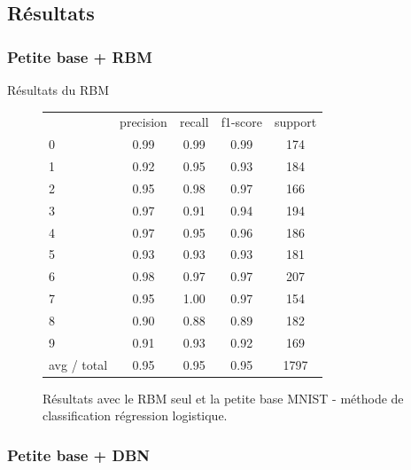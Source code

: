 \subsection{Résultats}

\subsubsection*{Petite base + RBM}

\begin{frame}{Résultats du RBM}
	\begin{figure}[ht!]
	\centering
	\begin{tabular}{l|c|c|c|c}
						 &  precision  &  recall & f1-score  & support \\
						0&       0.99   &   0.99    &  0.99   &    174 \\
						1 &      0.92    &  0.95     & 0.93     &  184 \\
						2  &     0.95    &  0.98      &0.97    &   166 \\
						3   &    0.97    &  0.91     & 0.94   &    194 \\
						4    &   0.97    &  0.95    &  0.96  &     186 \\
						5     &  0.93  &    0.93     & 0.93 &      181 \\
						6      & 0.98    &  0.97    &  0.97&       207 \\
						7       &0.95  &    1.00    &  0.97   &    154 \\
						8       &0.90   &   0.88     & 0.89   &    182 \\
						9 &      0.91    &  0.93    &  0.92     &  169 \\
	avg / total  &     0.95    &  0.95    &  0.95    &  1797 \\
	\end{tabular}
	\caption{Résultats avec le RBM seul et la petite base MNIST - méthode de classification régression logistique.}
	\end{figure} 
\end{frame}

\subsubsection*{Petite base + DBN}

